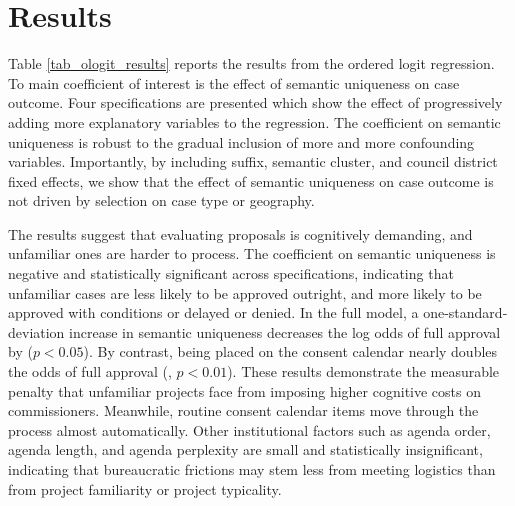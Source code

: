 \section{Results}\label{sec_results}

Table \ref{tab_ologit_results} reports the results from the ordered logit regression. To main coefficient of interest is the effect of semantic uniqueness on case outcome. Four specifications are presented which show the effect of progressively adding more explanatory variables to the regression. The coefficient on semantic uniqueness is robust to the gradual inclusion of more and more confounding variables. Importantly, by including suffix, semantic cluster, and council district fixed effects, we show that the effect of semantic uniqueness on case outcome is not driven by selection on case type or geography. 


The results suggest that evaluating proposals is cognitively demanding, and unfamiliar ones are harder to process. 
The coefficient on semantic uniqueness is negative and statistically significant across specifications, indicating that unfamiliar cases are less likely to be approved outright, and more likely to be approved with conditions or delayed or denied. In the full model, a one-standard-deviation increase in semantic uniqueness decreases the log odds of full approval by  ($p<0.05$). By contrast, being placed on the consent calendar nearly doubles the odds of full approval (, $p<0.01$). These results demonstrate the measurable penalty that unfamiliar projects face from imposing higher cognitive costs on commissioners. Meanwhile, routine consent calendar items move through the process almost automatically. Other institutional factors such as agenda order, agenda length, and agenda perplexity are small and statistically insignificant, indicating that bureaucratic frictions may stem less from meeting logistics than from project familiarity or project typicality.

